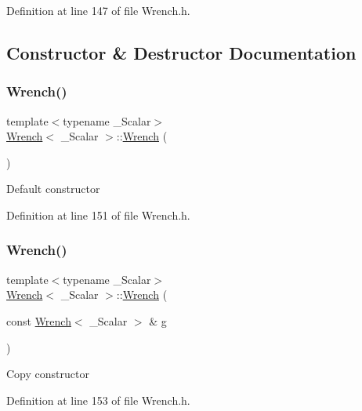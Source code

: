 Definition at line 147 of file Wrench.\+h.



\subsection{Constructor \& Destructor Documentation}
\hypertarget{class_wrench_a748f2f5a35ee560efa9baa6b7cf3457b}{}\label{class_wrench_a748f2f5a35ee560efa9baa6b7cf3457b} 
\subsubsection{\texorpdfstring{Wrench()}{Wrench()}\hspace{0.1cm}{\footnotesize\ttfamily [1/7]}}
{\footnotesize\ttfamily template$<$typename \+\_\+\+Scalar$>$ \\
\hyperlink{class_wrench}{Wrench}$<$ \+\_\+\+Scalar $>$\+::\hyperlink{class_wrench}{Wrench} (\begin{DoxyParamCaption}{ }\end{DoxyParamCaption})\hspace{0.3cm}{\ttfamily [inline]}}

Default constructor 

Definition at line 151 of file Wrench.\+h.

\hypertarget{class_wrench_a248ef8976ae4ba0cb0023888777be19b}{}\label{class_wrench_a248ef8976ae4ba0cb0023888777be19b} 
\subsubsection{\texorpdfstring{Wrench()}{Wrench()}\hspace{0.1cm}{\footnotesize\ttfamily [2/7]}}
{\footnotesize\ttfamily template$<$typename \+\_\+\+Scalar$>$ \\
\hyperlink{class_wrench}{Wrench}$<$ \+\_\+\+Scalar $>$\+::\hyperlink{class_wrench}{Wrench} (\begin{DoxyParamCaption}\item[{const \hyperlink{class_wrench}{Wrench}$<$ \+\_\+\+Scalar $>$ \&}]{g }\end{DoxyParamCaption})\hspace{0.3cm}{\ttfamily [inline]}}

Copy constructor 

Definition at line 153 of file Wrench.\+h.

